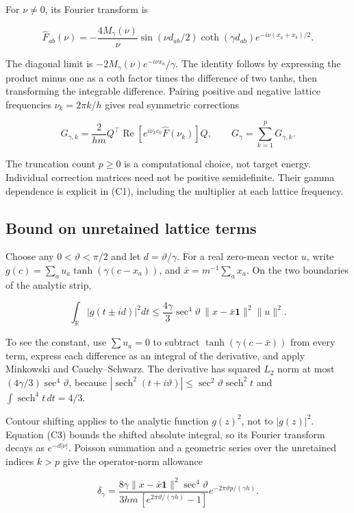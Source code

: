 \documentclass[11pt]{article}
\begin{document}
For \(\nu\ne0\), its Fourier transform is

\[
\widehat F_{ab}(\nu)
=-\frac{4M_\gamma(\nu)}{\nu}
\sin(\nu d_{ab}/2)\coth(\gamma d_{ab})
e^{-i\nu(x_a+x_b)/2}.
\tag{C1}
\]

The diagonal limit is \(-2M_\gamma(\nu)e^{-i\nu x_a}/\gamma\). The identity follows by expressing the product minus one as a coth factor times the difference of two tanhs, then transforming the integrable difference. Pairing positive and negative lattice frequencies \(\nu_k=2\pi k/h\) gives real symmetric corrections

\[
G_{\gamma,k}=\frac2{hm}Q^\top
\operatorname{Re}\!\left[e^{i\nu_k c_0}\widehat F(\nu_k)\right]Q,
\qquad G_\gamma=\sum_{k=1}^{p}G_{\gamma,k}.
\tag{C2}
\]

The truncation count \(p\ge0\) is a computational choice, not target energy. Individual correction matrices need not be positive semidefinite. Their gamma dependence is explicit in (C1), including the multiplier at each lattice frequency.

\subsection{Bound on unretained lattice terms}

Choose any \(0<\vartheta<\pi/2\) and let \(d=\vartheta/\gamma\). For a real zero-mean vector \(u\), write \(g(c)=\sum_a u_a\tanh(\gamma(c-x_a))\), and \(\bar x=m^{-1}\sum_a x_a\). On the two boundaries of the analytic strip,

\[
\int_{\mathbb R}|g(t\pm id)|^2dt
\le\frac{4\gamma}{3}\sec^4\vartheta\,
\|x-\bar x\mathbf1\|^2\|u\|^2.
\tag{C3}
\]

To see the constant, use \(\sum u_a=0\) to subtract \(\tanh(\gamma(c-\bar x))\) from every term, express each difference as an integral of the derivative, and apply Minkowski and Cauchy--Schwarz. The derivative has squared \(L_2\) norm at most \((4\gamma/3)\sec^4\vartheta\), because \(|\operatorname{sech}^2(t+i\vartheta)|\le\sec^2\vartheta\operatorname{sech}^2t\) and \(\int\operatorname{sech}^4t\,dt=4/3\).

Contour shifting applies to the analytic function \(g(z)^2\), not to \(|g(z)|^2\). Equation (C3) bounds the shifted absolute integral, so its Fourier transform decays as \(e^{-d|\nu|}\). Poisson summation and a geometric series over the unretained indices \(k>p\) give the operator-norm allowance

\[
\boxed{
\delta_\gamma=
\frac{8\gamma\|x-\bar x\mathbf1\|^2\sec^4\vartheta}
{3hm\,[e^{2\pi\vartheta/(\gamma h)}-1]}
e^{-2\pi\vartheta p/(\gamma h)}.
}
\tag{C4}
\]
\end{document}
